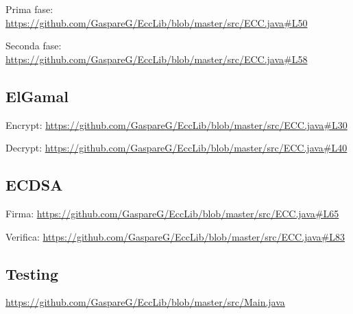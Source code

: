 \documentclass{article}
\begin{document}
	Prima fase: \url{https://github.com/GaspareG/EccLib/blob/master/src/ECC.java#L50}

	\medskip

	Seconda fase: \url{https://github.com/GaspareG/EccLib/blob/master/src/ECC.java#L58}
	
	\subsection{ElGamal}
	
	Encrypt: \url{https://github.com/GaspareG/EccLib/blob/master/src/ECC.java#L30}

	\medskip

	Decrypt: \url{https://github.com/GaspareG/EccLib/blob/master/src/ECC.java#L40}
	
	\subsection{ECDSA}
	
	Firma: \url{https://github.com/GaspareG/EccLib/blob/master/src/ECC.java#L65}

	\medskip

	Verifica: \url{https://github.com/GaspareG/EccLib/blob/master/src/ECC.java#L83}
	
	\subsection{Testing}
	
	\url{https://github.com/GaspareG/EccLib/blob/master/src/Main.java}
	
\end{document}
